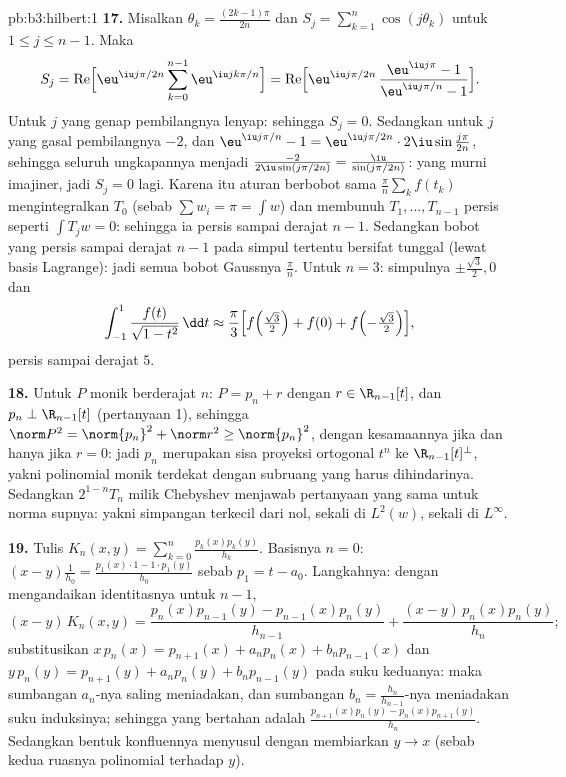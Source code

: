 \begin{solution}{pb:b3:hilbert:1}
\textbf{17.} Misalkan $\theta_k = \frac{(2k-1)\pi}{2n}$ dan $S_j
= \sum_{k=1}^n\cos(j\theta_k)$ untuk $1 \leq j \leq n-1$. Maka
\[
S_j = \operatorname{Re}\Bigl[\eu^{\iu j\pi/2n}
\sum_{k=0}^{n-1}\eu^{\iu jk\pi/n}\Bigr]
= \operatorname{Re}\Bigl[\eu^{\iu j\pi/2n}\,
\frac{\eu^{\iu j\pi} - 1}{\eu^{\iu j\pi/n} - 1}\Bigr] .
\]
Untuk $j$ yang genap pembilangnya lenyap: sehingga $S_j = 0$. Sedangkan untuk $j$ yang gasal
pembilangnya $-2$, dan $\eu^{\iu j\pi/n} - 1 =
\eu^{\iu j\pi/2n}\cdot2\iu\sin\frac{j\pi}{2n}$, sehingga seluruh
ungkapannya menjadi $\frac{-2}{2\iu\sin(j\pi/2n)} =
\frac{\iu}{\sin(j\pi/2n)}$: yang murni imajiner, jadi $S_j = 0$
lagi. Karena itu aturan berbobot sama $\frac\pi n\sum_kf(t_k)$
mengintegralkan $T_0$ (sebab $\sum w_i = \pi = \int w$) dan membunuh $T_1,
\dots, T_{n-1}$ persis seperti $\int T_jw = 0$: sehingga ia persis
sampai derajat $n - 1$. Sedangkan bobot yang persis sampai derajat $n-1$ pada simpul
tertentu bersifat tunggal (lewat basis Lagrange): jadi semua bobot Gaussnya
$\frac\pi n$. Untuk $n = 3$: simpulnya $\pm\frac{\sqrt3}2, 0$ dan
\[
\int_{-1}^1\frac{f(t)}{\sqrt{1 - t^2}}\,\dd t \approx
\frac\pi3\Bigl[f\Bigl(\tfrac{\sqrt3}2\Bigr) + f(0) +
f\Bigl(-\tfrac{\sqrt3}2\Bigr)\Bigr],
\]
persis sampai derajat $5$.

\textbf{18.} Untuk $P$ monik berderajat $n$: $P = p_n + r$
dengan $r \in \R_{n-1}[t]$, dan $p_n \perp \R_{n-1}[t]$
(pertanyaan 1), sehingga $\norm P^2 = \norm{p_n}^2 + \norm r^2 \geq
\norm{p_n}^2$, dengan kesamaannya jika dan hanya jika $r = 0$: jadi $p_n$ merupakan
sisa proyeksi ortogonal $t^n$ ke
$\R_{n-1}[t]^\perp$, yakni polinomial monik terdekat dengan
subruang yang harus dihindarinya. Sedangkan $2^{1-n}T_n$ milik Chebyshev menjawab
pertanyaan yang sama untuk norma supnya: yakni simpangan terkecil dari
nol, sekali di $L^2(w)$, sekali di $L^\infty$.

\textbf{19.} Tulis $K_n(x, y) =
\sum_{k=0}^n\frac{p_k(x)p_k(y)}{h_k}$. Basisnya $n = 0$: $(x -
y)\frac1{h_0} = \frac{p_1(x)\cdot1 - 1\cdot p_1(y)}{h_0}$
sebab $p_1 = t - a_0$. Langkahnya: dengan mengandaikan identitasnya untuk $n -
1$,
\[
(x - y)\,K_n(x,y) = \frac{p_n(x)p_{n-1}(y) -
p_{n-1}(x)p_n(y)}{h_{n-1}} +
\frac{(x - y)\,p_n(x)p_n(y)}{h_n} ;
\]
substitusikan $x\,p_n(x) = p_{n+1}(x) + a_np_n(x) +
b_np_{n-1}(x)$ dan $y\,p_n(y) = p_{n+1}(y) + a_np_n(y) +
b_np_{n-1}(y)$ pada suku keduanya: maka sumbangan $a_n$-nya
saling meniadakan, dan sumbangan $b_n = \frac{h_n}{h_{n-1}}$-nya
meniadakan suku induksinya; sehingga yang bertahan adalah
$\frac{p_{n+1}(x)p_n(y) - p_n(x)p_{n+1}(y)}{h_n}$. Sedangkan
bentuk konfluennya menyusul dengan membiarkan $y \to x$ (sebab kedua ruasnya
polinomial terhadap $y$).


\end{solution}
